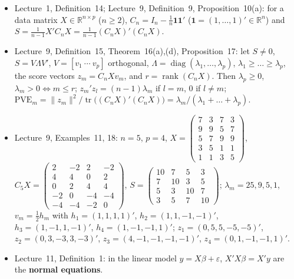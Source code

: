 \documentclass[12pt]{article}
\newcommand{\R}{\mathbb R}
\newcommand{\one}{\mathbf 1}
\DeclareMathOperator{\tr}{tr}
\DeclareMathOperator{\diag}{diag}
\DeclareMathOperator{\rank}{rank}
\theoremstyle{definition}
\newcommand{\lec}[1]{Lecture~#1}
\begin{document}
\begin{itemize}[itemsep=0pt,parsep=0pt,topsep=2pt]
numbered so that \(\lambda_1\geqslant\dots\geqslant\lambda_n\); then \(Q=[q_1\ \cdots\ q_n]\) is orthogonal,
\(Q'AQ=\diag(\lambda_1,\dots,\lambda_n)\), the \(\lambda_i\) are the eigenvalues of \(A\), and
\(\lambda_n\leqslant x'Ax/x'x\leqslant\lambda_1\) for \(x\ne0\), with equality at \(x=q_n\) and \(x=q_1\).
\item \lec{1}, Definition~14; \lec{9}, Definition~9, Proposition~10(a): for a data matrix \(X\in\R^{n\times p}\) (\(n\geqslant2\)),
\(C_n=I_n-\frac1n\one\one'\) (\(\one=(1,\dots,1)'\in\R^n\)) and \(S=\frac1{n-1}X'C_nX=\frac1{n-1}(C_nX)'(C_nX)\).
\item \lec{9}, Definition~15, Theorem~16(a),(d), Proposition~17: let \(S\ne0\), \(S=V\Lambda V'\),
\(V=[v_1\ \cdots\ v_p]\) orthogonal, \(\Lambda=\diag(\lambda_1,\dots,\lambda_p)\), \(\lambda_1\geqslant\dots\geqslant\lambda_p\),
the score vectors \(z_m=C_nXv_m\), and \(r=\rank(C_nX)\). Then \(\lambda_p\geqslant0\), \(\lambda_m>0\iff m\leqslant r\);
\(z_m'z_l=(n-1)\lambda_m\) if \(l=m\), \(0\) if \(l\ne m\);
\(\mathrm{PVE}_m=\lVert z_m\rVert^2/\tr\bigl((C_nX)'(C_nX)\bigr)=\lambda_m/(\lambda_1+\dots+\lambda_p)\).
\item \lec{9}, Examples~11, 18: \(n=5\), \(p=4\),
\(X=\left(\begin{smallmatrix}7&3&7&3\\9&9&5&7\\5&7&9&9\\3&5&1&1\\1&1&3&5\end{smallmatrix}\right)\),
\(C_5X=\left(\begin{smallmatrix}2&-2&2&-2\\4&4&0&2\\0&2&4&4\\-2&0&-4&-4\\-4&-4&-2&0\end{smallmatrix}\right)\),
\(S=\left(\begin{smallmatrix}10&7&5&3\\7&10&3&5\\5&3&10&7\\3&5&7&10\end{smallmatrix}\right)\); \(\lambda_m=25,9,5,1\),
\(v_m=\frac12h_m\) with \(h_1=(1,1,1,1)'\), \(h_2=(1,1,-1,-1)'\), \(h_3=(1,-1,1,-1)'\), \(h_4=(1,-1,-1,1)'\);
\(z_1=(0,5,5,-5,-5)'\), \(z_2=(0,3,-3,3,-3)'\), \(z_3=(4,-1,-1,-1,-1)'\), \(z_4=(0,1,-1,-1,1)'\).
\item \lec{11}, Definition~1: in the linear model \(y=X\beta+\varepsilon\), \(X'X\beta=X'y\) are the \textbf{normal
equations}.
\end{itemize}
\end{document}
